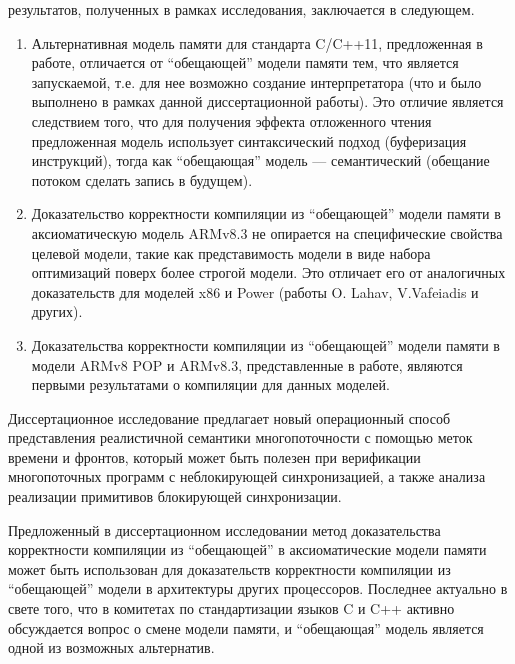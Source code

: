 {\novelty} результатов, полученных в рамках исследования, заключается в следующем.
\begin{enumerate}
  \item Альтернативная модель памяти для стандарта C/C++11, предложенная в работе, отличается от ``обещающей'' модели
  памяти  тем, что является запускаемой,
  т.е. для нее возможно создание интерпретатора (что и было выполнено в рамках данной диссертационной работы).
  Это отличие является следствием того, что для получения эффекта отложенного чтения предложенная модель использует
  синтаксический подход (буферизация инструкций), тогда как ``обещающая'' модель --- семантический (обещание потоком сделать
  запись в будущем).
  \item Доказательство корректности компиляции из ``обещающей'' модели памяти в аксиоматическую модель
        ARMv8.3 
        не опирается на специфические свойства целевой модели, такие как представимость модели в виде
        набора оптимизаций поверх более строгой модели.
        Это отличает его от аналогичных доказательств для моделей x86 и Power
        (работы O. Lahav, V.Vafeiadis и других).
  \item Доказательства корректности компиляции из ``обещающей'' модели памяти в
  модели ARMv8 POP  и ARMv8.3, представленные
  в работе, являются первыми результатами о компиляции для данных моделей.
\end{enumerate}

{\influence}
Диссертационное исследование предлагает новый
операционный способ представления реалистичной семантики многопоточности с помощью меток времени и фронтов, который
может быть полезен при верификации многопоточных программ с неблокирующей синхронизацией, а также анализа
реализации примитивов блокирующей синхронизации.

Предложенный в диссертационном исследовании метод доказательства корректности компиляции из ``обещающей'' в
аксиоматические модели памяти может быть использован для доказательств корректности компиляции
из ``обещающей'' модели в архитектуры других процессоров.
Последнее актуально в свете того, что
в комитетах по стандартизации языков C и C++ активно обсуждается вопрос о смене модели памяти, и ``обещающая'' модель 
является одной из возможных альтернатив. 

